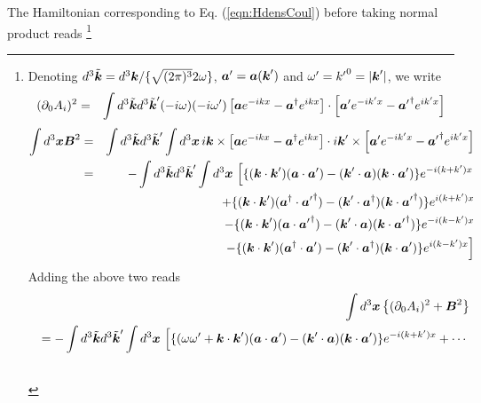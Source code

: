 The Hamiltonian corresponding to Eq. (\ref{eqn:HdensCoul}) 
before taking normal product reads
\footnote{%
Denoting $d^3 \tilde{\mbox{\boldmath $k$}} =  d^3\mbox{\boldmath $k$}/\{ \sqrt{(2\pi)^3} 2\omega\}$, 
$\mbox{\boldmath $a$}' = \mbox{\boldmath $a$}(\mbox{\boldmath $k$}')$ and $\omega' = {k'}^0 = |\mbox{\boldmath $k$}'|$,
we write
\begin{eqnarray*}
(\partial_0 A_i)^2
&=&
\int
d^3 \tilde{\mbox{\boldmath $k$}} d^3 \tilde{\mbox{\boldmath $k$}}'
(-i \omega)(-i \omega')
\left[
\mbox{\boldmath $a$} e^{-ikx} - \mbox{\boldmath $a$}^\dagger e^{ikx}
\right]
\cdot
\left[
\mbox{\boldmath $a$}' e^{-ik'x} - {\mbox{\boldmath $a$}'}^\dagger e^{ik'x}
\right]
\end{eqnarray*}
\begin{eqnarray*}
\int d^3 \bld{x}
\bld{B}^2
&=&
\int
d^3 \tilde{\bld{k}} d^3 \tilde{\bld{k}}'
\int d^3 \bld{x}\,
i \bld{k} \times
\left[
\bld{a} e^{-ikx} - \bld{a}^\dagger e^{ikx}
\right]
\cdot
i \bld{k}' \times
\left[
\bld{a}' e^{-ik'x} - {\bld{a}'}^\dagger e^{ik'x}
\right]
\\
&=&
-\int
d^3 \tilde{\bld{k}} d^3 \tilde{\bld{k}}'
\int d^3 \bld{x}\,
\left[
\{
(\bld{k}\cdot \bld{k}')
(\bld{a}\cdot \bld{a}')
-
(\bld{k}'\cdot \bld{a})
(\bld{k}\cdot \bld{a}')
\}
e^{-i(k+ k')x}
\right.
\\
&&
\hspace{25mm}
+
\{
(\bld{k}\cdot \bld{k}')
(\bld{a}^\dagger\cdot {\bld{a}'}^\dagger)
-
(\bld{k}'\cdot \bld{a}^\dagger)
(\bld{k}\cdot {\bld{a}'}^\dagger)
\}
e^{i(k+ k')x}
\\&&
\hspace{25mm}
-
\{
(\bld{k}\cdot \bld{k}')
(\bld{a}\cdot {\bld{a}'}^\dagger)
-
(\bld{k}'\cdot \bld{a})
(\bld{k}\cdot {\bld{a}'}^\dagger)
\}
e^{-i(k- k')x}
\\
&&
\left.
\hspace{25mm}
-
\{
(\bld{k}\cdot \bld{k}')
(\bld{a}^\dagger\cdot {\bld{a}'})
-
(\bld{k}'\cdot \bld{a}^\dagger)
(\bld{k}\cdot {\bld{a}'})
\}
e^{i(k- k')x}
\right]
\end{eqnarray*}
Adding the above two reads
\begin{eqnarray*}
&&\int d^3 \bld{x} \left\{(\partial_0 A_i)^2 + \bld{B}^2\right\}
\\
&&
=
-\int
d^3 \tilde{\bld{k}} d^3 \tilde{\bld{k}}'
\int d^3 \bld{x}\,
\left[
\{
(\omega \omega' +
\bld{k}\cdot \bld{k}')
(\bld{a}\cdot\bld{a}')
-
(\bld{k}'\cdot \bld{a})
(\bld{k}\cdot \bld{a}')
\}
e^{-i(k+ k')x}
+ \cdots
\right.
\\
&&
\hspace{25mm}

\end{eqnarray*}}
